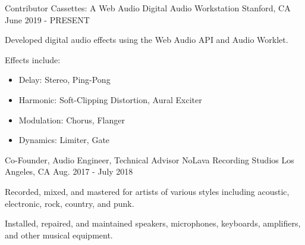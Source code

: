 \begin{cventries}
    \cventry
    {Contributor} %
    {Cassettes: A Web Audio Digital Audio Workstation} %
    {Stanford, CA} %
    {June 2019 - PRESENT} %
    {
      \begin{cvitems} %
        \item {Developed digital audio effects using the Web Audio API and Audio Worklet.}
        \item {Effects include:}
        \begin{itemize}
            \item {Delay: Stereo, Ping-Pong}
            \item {Harmonic: Soft-Clipping Distortion, Aural Exciter}
            \item {Modulation: Chorus, Flanger}
            \item {Dynamics: Limiter, Gate}
        \end{itemize}
      \end{cvitems}
    }

    \cventry
    {Co-Founder, Audio Engineer, Technical Advisor} %
    {NoLava Recording Studios} %
    {Los Angeles, CA} %
    {Aug. 2017 - July 2018} %
    {
      \begin{cvitems} %
        \item {Recorded, mixed, and mastered for artists of various styles including acoustic, electronic, rock, country, and punk.}
        \item {Installed, repaired, and maintained speakers, microphones, keyboards, amplifiers, and other musical equipment.}
      \end{cvitems}
    }

\end{cventries}
